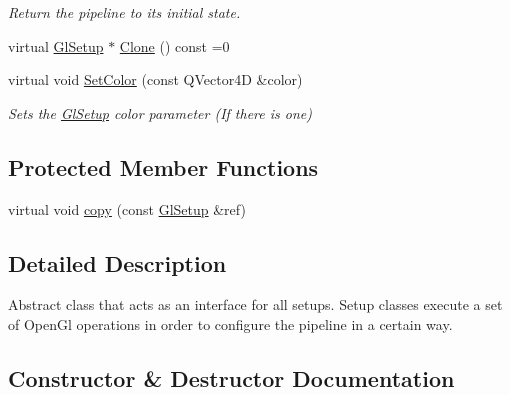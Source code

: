\begin{DoxyCompactItemize}
\begin{DoxyCompactList}\small\item\em Return the pipeline to its initial state. \end{DoxyCompactList}\item 
virtual \mbox{\hyperlink{class_geometry_engine_1_1_geometry_gl_setup_1_1_gl_setup}{Gl\+Setup}} $\ast$ \mbox{\hyperlink{class_geometry_engine_1_1_geometry_gl_setup_1_1_gl_setup_adf97b18fd8af32c63a189983ab35d5ae}{Clone}} () const =0
\item 
\mbox{\label{class_geometry_engine_1_1_geometry_gl_setup_1_1_gl_setup_acd5b3b2525d11f103f1d3cf298d4af94}} 
virtual void \mbox{\hyperlink{class_geometry_engine_1_1_geometry_gl_setup_1_1_gl_setup_acd5b3b2525d11f103f1d3cf298d4af94}{Set\+Color}} (const Q\+Vector4D \&color)
\begin{DoxyCompactList}\small\item\em Sets the \mbox{\hyperlink{class_geometry_engine_1_1_geometry_gl_setup_1_1_gl_setup}{Gl\+Setup}} color parameter (If there is one) \end{DoxyCompactList}\end{DoxyCompactItemize}
\subsection*{Protected Member Functions}
\begin{DoxyCompactItemize}
\item 
virtual void \mbox{\hyperlink{class_geometry_engine_1_1_geometry_gl_setup_1_1_gl_setup_a97e569658af28d7d60a3be95fa8cb0af}{copy}} (const \mbox{\hyperlink{class_geometry_engine_1_1_geometry_gl_setup_1_1_gl_setup}{Gl\+Setup}} \&ref)
\end{DoxyCompactItemize}


\subsection{Detailed Description}
Abstract class that acts as an interface for all setups. Setup classes execute a set of Open\+Gl operations in order to configure the pipeline in a certain way. 

\subsection{Constructor \& Destructor Documentation}
\mbox{\label{class_geometry_engine_1_1_geometry_gl_setup_1_1_gl_setup_a2aeb6f3e7475c4021597de2fb0bd9060}} 
